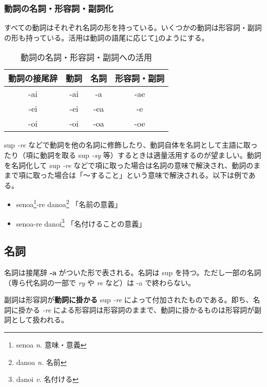 \subsubsection{動詞の名詞・形容詞・副詞化}

すべての動詞はそれぞれ名詞の形を持っている。いくつかの動詞は形容詞・副詞の形も持っている。活用は動詞の語尾に応じて\cref{table:conjugation-of-verb}のようにする。

\begin{table}[h]
    \centering
    \caption{動詞の名詞・形容詞・副詞への活用}
    \label{table:conjugation-of-verb}
    \begin{tabular}{cccc}
        \hline
        動詞の接尾辞 & 動詞 & 名詞 & 形容詞・副詞 \\
        \hline \hline
        -ai & -ai & -a  & -ae \\
        -ei & -ei & -ea & -e  \\
        -oi & -oi & -oa & -oe \\
        \hline
    \end{tabular}
\end{table}

sup \emph{-re} などで動詞を他の名詞に修飾したり、動詞自体を名詞として主語に取ったり（項に動詞を取る sup \emph{-sy} 等）するときは適量活用するのが望ましい。動詞を名詞化して sup \emph{-re} などで項に取った場合は名詞の意味で解決され、動詞のままで項に取った場合は「～すること」という意味で解決される。以下は例である。

\begin{itemize}
    \item senoa\footnote{senoa \emph{n.} 意味・意義}-re danoa\footnote{danoa \emph{n.} 名前} 「名前の意義」
    \item senoa-re danoi\footnote{danoi \emph{v.} 名付ける} 「名付けることの意義」
\end{itemize}

\subsection{名詞}

名詞は接尾辞 \textbf{-a} がついた形で表される。名詞は sup を持つ。ただし一部の名詞（専ら代名詞の一部で \emph{ry} や \emph{re} など）は -a で終わらない。

副詞は形容詞が\textbf{動詞に掛かる} sup \emph{-re} によって付加されたものである。即ち、名詞に掛かる \emph{-re} による形容詞は形容詞のままで、動詞に掛かるものは形容詞が副詞として扱われる。

